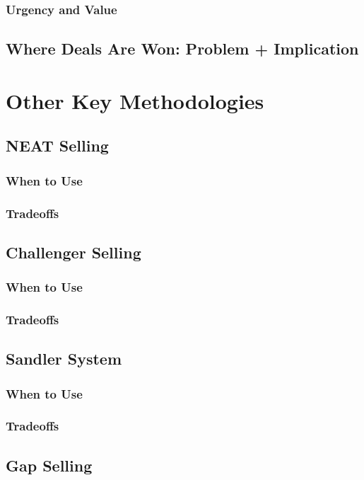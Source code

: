         \subsubsection{Urgency and Value}\mbox{}
    \subsection{Where Deals Are Won: Problem + Implication}\mbox{}

\section{Other Key Methodologies}\mbox{}
    \subsection{NEAT Selling}\mbox{}
        \subsubsection{When to Use}\mbox{}
        \subsubsection{Tradeoffs}\mbox{}
    \subsection{Challenger Selling}\mbox{}
        \subsubsection{When to Use}\mbox{}
        \subsubsection{Tradeoffs}\mbox{}
    \subsection{Sandler System}\mbox{}
        \subsubsection{When to Use}\mbox{}
        \subsubsection{Tradeoffs}\mbox{}
    \subsection{Gap Selling}\mbox{}
